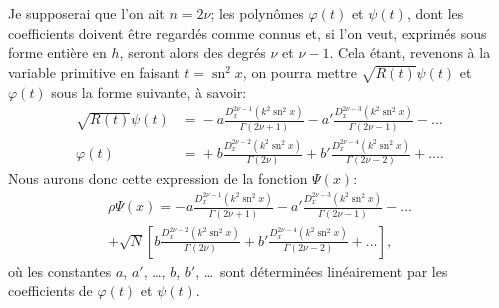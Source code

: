 \documentclass[11pt,leqno,oneside,letterpaper]{book}[2005/09/16]
\DeclareMathOperator{\sn}{sn}
\begin{document}
Je supposerai que l'on ait $n = 2\nu$; les polyn\^omes $\varphi(t)$ et $\psi(t)$, dont
les coefficients doivent \^etre regard\'es comme connus et, si l'on veut, exprim\'es
sous forme enti\`ere en $h$, seront alors des degr\'es $\nu$ et $\nu-1$. Cela
\'etant, revenons \`a la variable primitive en faisant $t=\sn^2x$, on pourra
mettre $\sqrt{R(t)}\psi(t)$ et $\varphi(t)$ sous la forme suivante, \`a savoir:
\begin{align*}
  \sqrt{R(t)}\psi(t) &= {}- a \frac{D_x^{2\nu-1}(k^2\sn^2x)}{\Gamma(2\nu+1)}
                        - a' \frac{D_x^{2\nu-3}(k^2\sn^2x)}{\Gamma(2\nu-1)} - \ldots \\
          \varphi(t) &= {}+ b \frac{D_x^{2\nu-2}(k^2\sn^2x)}{\Gamma(2\nu)}
                        + b' \frac{D_x^{2\nu-4}(k^2\sn^2x)}{\Gamma(2\nu-2)} + \ldots.
\end{align*}
Nous aurons donc cette expression de la fonction $\Psi(x)$:
\begin{multline*}
\rho\Psi(x) =
  - a \frac{D_x^{2\nu-1}(k^2\sn^2x)}{\Gamma(2\nu+1)}
  - a'\frac{D_x^{2\nu-3}(k^2\sn^2x)}{\Gamma(2\nu-1)} - \ldots \\
+ \sqrt{N}\left[
    b \frac{D_x^{2\nu-2}(k^2\sn^2x)}{\Gamma(2\nu)}
  + b'\frac{D_x^{2\nu-4}(k^2\sn^2x)}{\Gamma(2\nu-2)} + \ldots
\right],
\end{multline*}
o\`u les constantes $a$, $a'$, \ldots, $b$, $b'$, \ldots\ sont d\'etermin\'ees lin\'eairement par
les coefficients de $\varphi(t)$ et $\psi(t)$.
\end{document}
